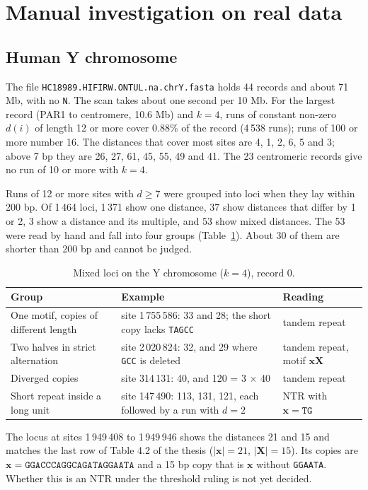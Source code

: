 \documentclass[11pt,a4paper]{article}
\begin{document}
\section{Manual investigation on real data}\label{sec:manual}
\subsection{Human Y chromosome}
The file \texttt{HC18989.HIFIRW.ONTUL.na.chrY.fasta} holds 44 records and about
71 Mb, with no \texttt{N}. The scan takes about one second per 10 Mb. For the
largest record (PAR1 to centromere, 10.6 Mb) and $k=4$, runs of constant
non-zero $d(i)$ of length 12 or more cover 0.88\% of the record (4\,538 runs);
runs of 100 or more number 16. The distances that cover most sites are 4, 1, 2,
6, 5 and 3; above 7 bp they are 26, 27, 61, 45, 55, 49 and 41. The 23
centromeric records give no run of 10 or more with $k=4$.

Runs of 12 or more sites with $d\ge 7$ were grouped into loci when they lay
within 200 bp. Of 1\,464 loci, 1\,371 show one distance, 37 show distances that
differ by 1 or 2, 3 show a distance and its multiple, and 53 show mixed
distances. The 53 were read by hand and fall into four groups
(Table~\ref{tab:ygroups}). About 30 of them are shorter than 200 bp and cannot
be judged.

\begin{table}[h]\centering
\caption{Mixed loci on the Y chromosome ($k=4$), record 0.}\label{tab:ygroups}
\begin{tabular}{p{4.2cm}p{5.6cm}p{4.2cm}}
\toprule
Group & Example & Reading \\
\midrule
One motif, copies of different length & site 1\,755\,586: 33 and 28; the short copy lacks \texttt{TAGCC} & tandem repeat \\
Two halves in strict alternation & site 2\,020\,824: 32, and 29 where \texttt{GCC} is deleted & tandem repeat, motif $\mathbf{xX}$ \\
Diverged copies & site 314\,131: 40, and 120 = 3 $\times$ 40 & tandem repeat \\
Short repeat inside a long unit & site 147\,490: 113, 131, 121, each followed by a run with $d=2$ & NTR with $\mathbf{x}=\texttt{TG}$ \\
\bottomrule
\end{tabular}
\end{table}

The locus at sites 1\,949\,408 to 1\,949\,946 shows the distances 21 and 15 and
matches the last row of Table 4.2 of the thesis ($|\mathbf{x}|=21$,
$|\mathbf{X}|=15$). Its copies are
$\mathbf{x}=\texttt{GGACCCAGGCAGATAGGAATA}$ and a 15 bp copy that is
$\mathbf{x}$ without \texttt{GGAATA}. Whether this is an NTR under the
threshold ruling is not yet decided.
\end{document}

